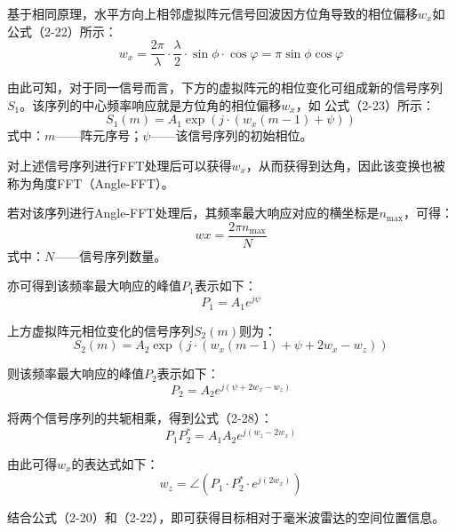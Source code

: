 基于相同原理，水平方向上相邻虚拟阵元信号回波因方位角导致的相位偏移$w_{x}$如公式（2-22）所示：
\begin{equation}
    w_{x}=\frac{2\pi}{\lambda}\cdot\frac{\lambda}{2}\cdot\sin\phi\cdot\cos\varphi=\pi\sin\phi\cos\varphi 
\end{equation}

由此可知，对于同一信号而言，下方的虚拟阵元的相位变化可组成新的信号序列$S_{1}$。该序列的中心频率响应就是方位角的相位偏移$w_{x}$，如
公式（2-23）所示：
\begin{equation}
    S_{1}\left(m\right)=A_{1}\exp\left(j\cdot\left(w_{x}\left(m-1\right)+\psi\right)\right)
\end{equation}
式中：$m$——阵元序号；$\psi$——该信号序列的初始相位。

对上述信号序列进行FFT处理后可以获得$w_{x}$，从而获得到达角，因此该变换也被称为角度FFT（Angle-FFT）。

若对该序列进行Angle-FFT处理后，其频率最大响应对应的横坐标是$n_{\mathrm{max}}$，可得：
\begin{equation}
    wx=\frac{2\pi n_{\mathrm{max}}}{N}
\end{equation}
式中：$N$——信号序列数量。

亦可得到该频率最大响应的峰值$P_{1}$表示如下：
\begin{equation}
    P_{1}=A_{1}e^{j\psi}
\end{equation}

上方虚拟阵元相位变化的信号序列$S_{2}(m)$则为：
\begin{equation}
    S_{2}(m)=A_{2}\exp\left(j\cdot\left(w_{x}\left(m-1\right)+\psi+2w_{x}-w_{z}\right)\right)
\end{equation}

则该频率最大响应的峰值$P_{2}$表示如下：
\begin{equation}
    P_{2}=A_{2}e^{j\left(\psi+2w_{x}-w_{z}\right)}
\end{equation}

将两个信号序列的共轭相乘，得到公式（2-28）：
\begin{equation}
    P_{1}P_{2}^{*}=A_{1}A_{2}e^{j(w_{z}-2w_{x})}
\end{equation}

由此可得$w_{x}$的表达式如下：
\begin{equation}
    w_{z}=\angle\left(P_{1}\cdot P_{2}^{*}\cdot e^{j(2w_{x})}\right)
\end{equation}

结合公式（2-20）和（2-22），即可获得目标相对于毫米波雷达的空间位置信息。

